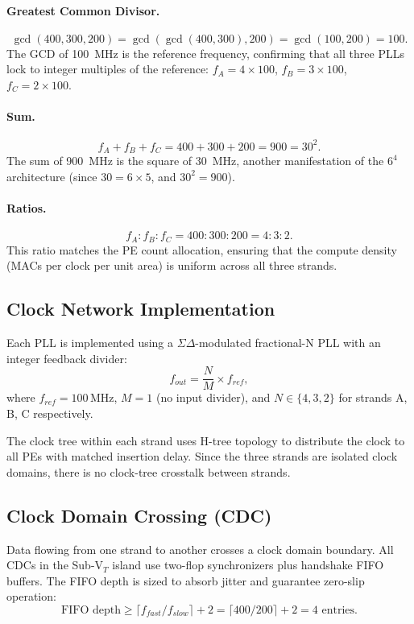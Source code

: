 \paragraph{Greatest Common Divisor.}
\[
  \gcd(400, 300, 200) = \gcd(\gcd(400, 300), 200) = \gcd(100, 200) = 100.
\]
The GCD of 100~MHz is the reference frequency, confirming that all three PLLs lock to integer
multiples of the reference: $f_A = 4 \times 100$, $f_B = 3 \times 100$, $f_C = 2 \times 100$.

\paragraph{Sum.}
\[
  f_A + f_B + f_C = 400 + 300 + 200 = 900 = 30^2.
\]
The sum of 900~MHz is the square of 30~MHz, another manifestation of the $6^4$ architecture
(since $30 = 6 \times 5$, and $30^2 = 900$).

\paragraph{Ratios.}
\[
  f_A : f_B : f_C = 400 : 300 : 200 = 4 : 3 : 2.
\]
This ratio matches the PE count allocation, ensuring that the compute density
(MACs per clock per unit area) is uniform across all three strands.

\subsection{Clock Network Implementation}

Each PLL is implemented using a $\Sigma\Delta$-modulated fractional-N PLL with an integer
feedback divider:
\[
  f_{out} = \frac{N}{M} \times f_{ref},
\]
where $f_{ref} = 100\,\text{MHz}$, $M = 1$ (no input divider), and $N \in \{4, 3, 2\}$ for
strands A, B, C respectively.

The clock tree within each strand uses H-tree topology to distribute the clock to all PEs
with matched insertion delay.  Since the three strands are isolated clock domains, there is no
clock-tree crosstalk between strands.

\subsection{Clock Domain Crossing (CDC)}

Data flowing from one strand to another crosses a clock domain boundary.  All CDCs in the
Sub-V$_T$ island use two-flop synchronizers plus handshake FIFO buffers.  The FIFO depth is
sized to absorb jitter and guarantee zero-slip operation:
\[
  \text{FIFO depth} \geq \lceil f_{fast} / f_{slow} \rceil + 2 = \lceil 400/200 \rceil + 2 = 4 \text{ entries}.
\]

